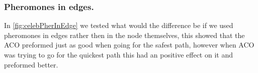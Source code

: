 









\subsubsection{Pheromones in edges.}

In \ref{fig:celebPherInEdge} we tested what would the difference be if we used pheromones in edges rather then in the node themselves, this showed that the ACO preformed just as good when going for the safest path, however when ACO was trying to go for the quickest path this had an positive effect on it and preformed better.

